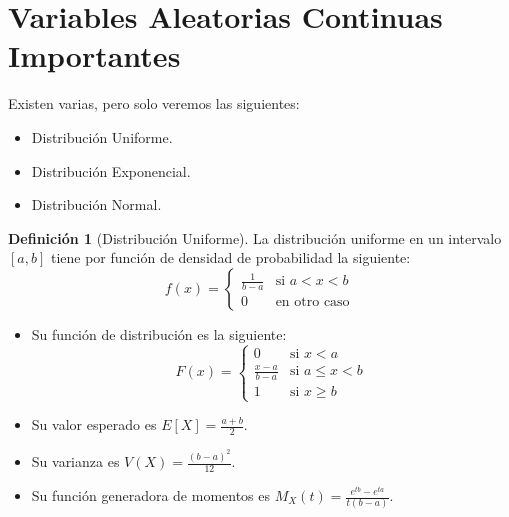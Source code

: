 \documentclass{article}
\theoremstyle{definition}
\newtheorem{definition}{Definición}[section]
\theoremstyle{plain}
\theoremstyle{remark}
\begin{document}
\section{Variables Aleatorias Continuas Importantes}
Existen varias, pero solo veremos las siguientes:

\begin{itemize}
\item Distribución Uniforme.
\item Distribución Exponencial.
\item Distribución Normal.
\end{itemize}

\begin{definition}[Distribución Uniforme]
La distribución uniforme en un intervalo $[a, b]$ tiene por función de densidad de probabilidad la siguiente:
\[
f(x) = \begin{cases}
\frac{1}{b - a} & \text{si } a < x < b \\
0 & \text{en otro caso}
\end{cases}
\]

\begin{itemize}
\item Su función de distribución es la siguiente:
\[
F(x) = \begin{cases}
0 & \text{si } x < a \\
\frac{x - a}{b - a} & \text{si } a \leq x < b \\
1 & \text{si } x \geq b
\end{cases}
\]

\item Su valor esperado es $E[X] = \frac{a + b}{2}$.
\item Su varianza es $V(X) = \frac{(b - a)^2}{12}$.
\item Su función generadora de momentos es $M_X(t) = \frac{e^{tb} - e^{ta}}{t(b - a)}$.

\end{itemize}

\end{definition}
\end{document}
